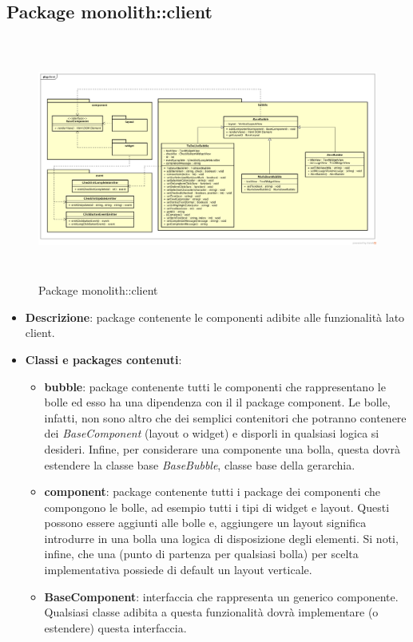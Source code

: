 \subsection{Package monolith::client}

\label{Package monolith::client}
\begin{figure}[H]
	\centering
	\includegraphics[width=16cm, height=8cm]{Sezioni/Packages/SDK/client.png}
	\caption{Package monolith::client}
\end{figure}

\begin{itemize}
\item \textbf{Descrizione}: package contenente le componenti adibite alle funzionalità lato client. 
\item \textbf{Classi e packages contenuti}:
\begin{itemize}
	\item \textbf{bubble}: package contenente tutti le componenti che rappresentano le bolle ed esso ha una dipendenza con il il package component. Le bolle, infatti, non sono altro che dei semplici contenitori che potranno contenere dei \textit{BaseComponent} (layout o widget) e disporli in qualsiasi logica si desideri. Infine, per considerare una componente una bolla, questa dovrà estendere la classe base \textit{BaseBubble}, classe base della gerarchia.
	\item \textbf{component}: package contenente tutti i package dei componenti che compongono le bolle, ad esempio tutti i tipi di widget e layout. Questi possono essere aggiunti alle bolle e, aggiungere un layout significa introdurre in una bolla una logica di disposizione degli elementi. Si noti, infine, che una  (punto di partenza per qualsiasi bolla) per scelta implementativa possiede di default un layout verticale.
	\item \textbf{BaseComponent}: interfaccia che rappresenta un generico componente. Qualsiasi classe adibita a questa funzionalità dovrà implementare (o estendere) questa interfaccia.
\end{itemize}
\end{itemize}

